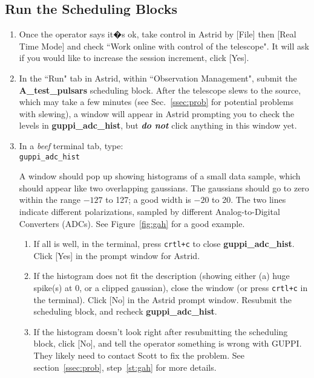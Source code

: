 \documentclass[11pt]{article}
\begin{document}
\subsection{Run the Scheduling Blocks}\label{ssec:sched}  %
\begin{enumerate}
 \item Once the operator says it�s ok, take control in Astrid by [File] then [Real Time Mode] and check ``Work online with control of the telescope". It will ask if you would like to increase the session increment, click [Yes].
 \item In the ``Run" tab in Astrid, within ``Observation Management", submit the \textbf{A\_test\_pulsars} scheduling block.  After the telescope slews to the source, which may take a few minutes (see Sec.~\ref{ssec:prob} for potential problems with slewing), a window will appear in Astrid prompting you to check the levels in \textbf{guppi\_adc\_hist}, but \textbf{\textit{do not}} click anything in this window yet.
 \item \label{st:adc} In a \textit{beef} terminal tab, type: \\
 \indent\texttt{guppi\_adc\_hist}

 A window should pop up showing histograms of a small data sample, which should appear like two overlapping gaussians. The gaussians should go to zero within the range $-127$ to 127; a good width is $-20$ to 20. The two lines indicate different polarizations, sampled by different Analog-to-Digital Converters (ADCs).  See Figure~\ref{fig:gah} for a good example.

 \begin{enumerate}
  \item If all is well, in the terminal, press \texttt{crtl+c} to close \textbf{guppi\_adc\_hist}.  Click [Yes] in the prompt window for Astrid.  
  \item If the histogram does not fit the description (showing either (a) huge spike(s) at 0, or a clipped gaussian), close the window (or press \texttt{crtl+c} in the terminal).  Click [No] in the Astrid prompt window.  Resubmit the scheduling block, and recheck \textbf{guppi\_adc\_hist}. 
  \item If the histogram doesn't look right after resubmitting the scheduling block, click [No], and tell the operator something is wrong with GUPPI.  They likely need to contact Scott to fix the problem.  See section~\ref{ssec:prob}, step~\ref{st:gah} for more details.
 \end{enumerate}
 

\end{enumerate}
\end{document}
